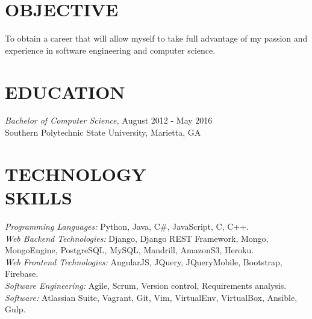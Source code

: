 \documentclass[margin, 10pt]{res} %
\begin{document}
\begin{resume}

 
\section{OBJECTIVE}  

To obtain a career that will allow myself to take full advantage of my passion and experience in software engineering and computer science. 


\section{EDUCATION}

{\sl Bachelor of Computer Science,}  \hfill August 2012 - May 2016 \\
Southern Polytechnic State University, Marietta, GA\\
 

\section{TECHNOLOGY \\ SKILLS} 

{\sl Programming Languages:} Python, Java, C\#, JavaScript, C, C++. \\
{\sl Web Backend Technologies:} Django, Django REST Framework, Mongo, MongoEngine, PostgreSQL, MySQL, Mandrill, AmazonS3, Heroku. \\
{\sl Web Frontend Technologies:} AngularJS, JQuery, JQueryMobile, Bootstrap, Firebase. \\
{\sl Software Engineering:} Agile, Scrum, Version control, Requirements analysis. \\
{\sl Software:} Atlassian Suite, Vagrant, Git, Vim, VirtualEnv, VirtualBox, Ansible, Gulp. \\
 

\end{resume}
\end{document}
